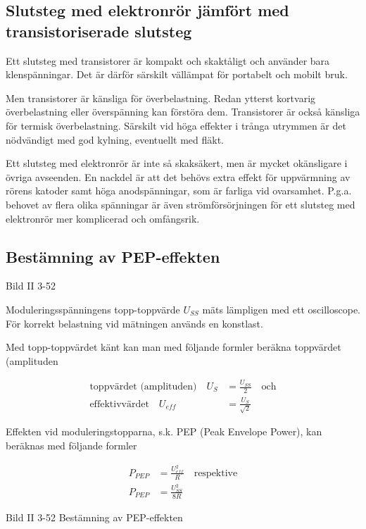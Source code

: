 \subsection{Slutsteg med elektronrör jämfört med transistoriserade slutsteg}

Ett slutsteg med transistorer är kompakt och skaktåligt och använder
bara klenspänningar. Det är därför särskilt vällämpat för portabelt
och mobilt bruk.

Men transistorer är känsliga för överbelastning. Redan ytterst
kortvarig överbelastning eller överspänning kan förstöra dem.
Transistorer är också känsliga för termisk överbelastning. Särskilt
vid höga effekter i trånga utrymmen är det nödvändigt med god kylning,
eventuellt med fläkt.

Ett slutsteg med elektronrör är inte så skaksäkert, men är mycket
okänsligare i övriga avseenden. En nackdel är att det behövs extra
effekt för uppvärmning av rörens katoder samt höga anodspänningar, som
är farliga vid ovarsamhet. P.g.a. behovet av flera olika spänningar är
även strömförsörjningen för ett slutsteg med elektronrör mer
komplicerad och omfångsrik.

\subsection{Bestämning av PEP-effekten}

Bild II 3-52

Moduleringsspänningens topp-toppvärde \(U_{SS}\) mäts lämpligen med
ett oscilloscope. För korrekt belastning vid mätningen används en
konstlast.

Med topp-toppvärdet känt kan man med följande formler beräkna
toppvärdet (amplituden

\begin{align*}
  \text{toppvärdet (amplituden)} \quad
  U_S & = \frac{U_{SS}}{2}
  \quad \text{och} \\
  \text{effektivvärdet} \quad
  U_{eff} & = \frac{U_S}{\sqrt{2}}
\end{align*}

Effekten vid moduleringstopparna, s.k.  PEP (Peak Envelope Power), kan
beräknas med följande formler

\begin{align*}
  P_{PEP} &= \frac{U_{eff}^2}{R} \quad \text{respektive} \\
  P_{PEP} &= \frac{U_{SS}^2}{8R}
\end{align*}

Bild II 3-52 Bestämning av PEP-effekten

